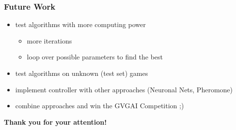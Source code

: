 \documentclass{beamer}
\begin{document}
\begin{frame}
\frametitle{Future Work}

	\begin{itemize}
		\item test algorithms with more computing power
		\begin{itemize}
			\item more iterations
			\item loop over possible parameters to find the best
		\end{itemize}
		\item test algorithms on unknown (test set) games
		\item implement controller with other approaches (Neuronal Nets, Pheromone)
		\item combine approaches and win the GVGAI Competition ;)
	\end{itemize}
\end{frame}




\begin{frame}
\begin{center}
\textbf{\LARGE Thank you for your attention!}
\end{center}

\end{frame}
\end{document}
